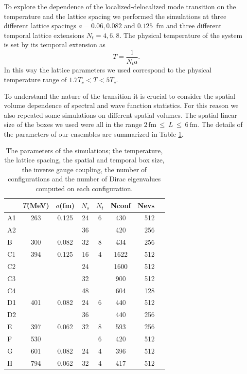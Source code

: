 \documentclass[twocolumn, prd, preprintnumbers, amsmath,
  amssymb, showpacs, floatfix]{revtex4-1}
\begin{document}
To explore the dependence of the localized-delocalized mode transition on the
temperature and the lattice spacing we performed the simulations at three
different lattice spacings $a=0.06, 0.082$ and $0.125$~fm and three different
temporal lattice extensions $N_t=4, 6, 8$. The physical temperature of the
system is set by its temporal extension as
\begin{equation}
  T = \frac{1}{N_t a}.
\end{equation}
In this way the lattice parameters we used correspond to the physical
temperature range of $1.7 T_c < T < 5 T_c$.

To understand the nature of the transition it is crucial to consider the
spatial volume dependence of spectral and wave function statistics. For this
reason we also repeated some simulations on different spatial volumes. The
spatial linear size of the boxes we used were all in the range $2 \,
\mathrm{fm}~\leq~L~\leq~6 \, \mathrm{fm}$.  The details of the parameters of
our ensembles are summarized in Table \ref{tab:sim_parameters}.

\begin{table}
 \begin{ruledtabular}
 \begin{tabular}{lcccccrr}
     &  $T$(MeV) & $a$(fm) & $N_s$  & $N_t$ & Nconf & Nevs \\ \hline
 A1 &  263       & 0.125   & 24    & 6    & 430   & 512 \\
 A2 &            &         & 36    &      & 420   & 256 \\ 
 B  &  300       & 0.082   & 32    & 8    & 434   & 256 \\
 C1 &  394       & 0.125   & 16    & 4    &1622   & 512 \\
 C2 &            &         & 24    &      &1600   & 512 \\
 C3 &            &         & 32    &      & 900   & 512 \\
 C4 &            &         & 48    &      & 604   & 128 \\
 D1 &  401       & 0.082   & 24    & 6    & 440   & 512 \\
 D2 &            &         & 36    &      & 440   & 256 \\
 E  &  397       & 0.062   & 32    & 8    & 593   & 256 \\ 
 F  &  530       &         &       & 6    & 420   & 512 \\ 
 G  &  601       & 0.082   & 24    & 4    & 396   & 512 \\  
 H  &  794       & 0.062   & 32    & 4    & 417   & 512 \\
 \end{tabular}
 \end{ruledtabular}
 \caption{\label{tab:sim_parameters} The parameters of the simulations; the
   temperature, the lattice spacing, the spatial and temporal box size, the
   inverse gauge coupling, the number of configurations and the number of
   Dirac eigenvalues computed on each configuration.}
\end{table}
\end{document}
